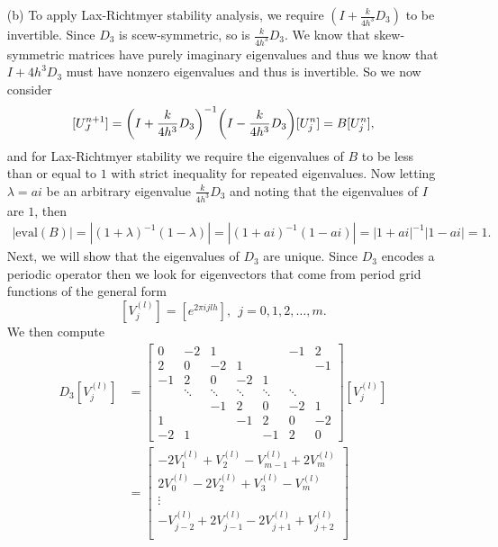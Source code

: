 \documentclass[12pt]{report}
\begin{document}
\begin{solution}
\begin{enumerate}
        \item [(b)]
        To apply Lax-Richtmyer stability analysis, we require $(I+\frac{k}{4h^3}D_3)$ to be invertible. Since $D_3$ is scew-symmetric, so is $\frac{k}{4h^3}D_3$. We know that skew-symmetric matrices have purely imaginary eigenvalues and thus we know that $I + {4h^3}D_3$ must have nonzero eigenvalues and thus is invertible. So we now consider 
        \[
            [U_J^{n+1}] = {\left(I +\frac{k}{4h^3}D_3\right)}^{-1}{\left(I - \frac{k}{4h^3}D_3\right)}[U_j^n] = B[U_j^n],
        \]
        and for Lax-Richtmyer stability we require the eigenvalues of $B$ to be less than or equal to $1$ with strict inequality for repeated eigenvalues. Now letting $\lambda = ai$ be an arbitrary eigenvalue $\frac{k}{4h^3}D_3$ and noting that the eigenvalues of $I$ are $1$, then
        \begin{align*}
            |\text{eval}(B)|=|(1 + \lambda)^{-1}(1 - \lambda)| = |(1+ai)^{-1}(1-ai)| = |1+ai|^{-1}|1-ai| = 1.
        \end{align*} 
        Next, we will show that the eigenvalues of $D_3$ are unique. Since $D_3$ encodes a periodic operator then we look for eigenvectors that come from period grid functions of the general form
        \[
            [V_j^{(l)}] = [e^{2\pi i j l h}], ~~j=0,1,2,\dots,m.
        \]
        We then compute
        \begin{align*}
            D_3[V_j^{(l)}] &= \begin{bmatrix}
                0 & -2 & 1 &&& -1 & 2\\
                2 & 0 & -2 & 1 &&& -1 \\
                -1 & 2 & 0 & -2 & 1 \\
                & \ddots & \ddots & \ddots & \ddots & \ddots \\
                && -1 & 2 & 0 & -2 & 1 \\
                1 &&& -1 & 2 & 0 & -2 \\
                -2 & 1 &&& -1 & 2 & 0
                \end{bmatrix}[V_j^{(l)}]\\
                &=\begin{bmatrix}
                    -2V_1^{(l)} + V_2^{(l)} - V_{{m-1}}^{(l)} + 2V_m^{(l)}\\
                    2V_{0}^{(l)} - 2V_2^{(l)} + V_{{3}}^{(l)} - V_{m}^{(l)}\\
                    \vdots\\
                    -V^{(l)}_{j-2} + 2V^{(l)}_{j-1} - 2V^{(l)}_{j+1} + V^{(l)}_{j+2}\\

\end{bmatrix}
\end{align*}
\end{enumerate}
\end{solution}
\end{document}

